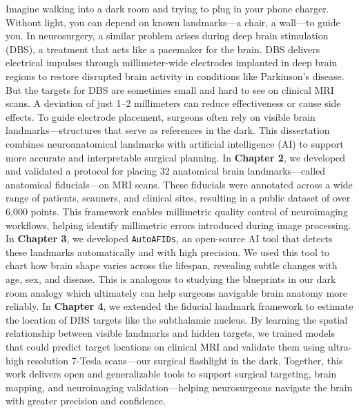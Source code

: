 \onehalfspacing
Imagine walking into a dark room and trying to plug in your phone charger. Without light, you can depend on known landmarks—a chair, a wall—to guide you. In neurosurgery, a similar problem arises during deep brain stimulation (DBS), a treatment that acts like a pacemaker for the brain. DBS delivers electrical impulses through millimeter-wide electrodes implanted in deep brain regions to restore disrupted brain activity in conditions like Parkinson’s disease. But the targets for DBS are sometimes small and hard to see on clinical MRI scans. A deviation of just 1–2 millimeters can reduce effectiveness or cause side effects. To guide electrode placement, surgeons often rely on visible brain landmarks—structures that serve as references in the dark. This dissertation combines neuroanatomical landmarks with artificial intelligence (AI) to support more accurate and interpretable surgical planning. In \textbf{Chapter 2}, we developed and validated a protocol for placing 32 anatomical brain landmarks—called anatomical fiducials—on MRI scans. These fiducials were annotated across a wide range of patients, scanners, and clinical sites, resulting in a public dataset of over 6,000 points. This framework enables millimetric quality control of neuroimaging workflows, helping identify millimetric errors introduced during image processing. In \textbf{Chapter 3}, we developed \texttt{AutoAFIDs}, an open-source AI tool that detects these landmarks automatically and with high precision. We used this tool to chart how brain shape varies across the lifespan, revealing subtle changes with age, sex, and disease. This is analogous to studying the blueprints in our dark room analogy which ultimately can help surgeons navigable brain anatomy more reliably. In \textbf{Chapter 4}, we extended the fiducial landmark framework to estimate the location of DBS targets like the subthalamic nucleus. By learning the spatial relationship between visible landmarks and hidden targets, we trained models that could predict target locations on clinical MRI and validate them using ultra-high resolution 7-Tesla scans—our surgical flashlight in the dark. Together, this work delivers open and generalizable tools to support surgical targeting, brain mapping, and neuroimaging validation—helping neurosurgeons navigate the brain with greater precision and confidence.


